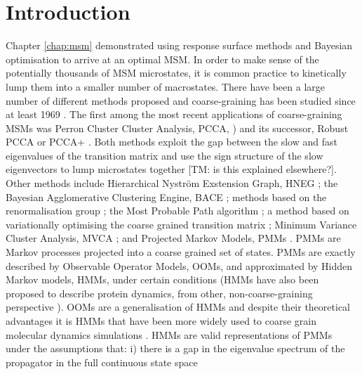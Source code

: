 \section{Introduction}
Chapter \ref{chap:msm} demonstrated using response surface methods and Bayesian optimisation to arrive at an optimal MSM. In order to make sense of the potentially thousands of MSM microstates, it is common practice to kinetically lump them into a smaller number of macrostates. There have been a large number of different methods proposed and coarse-graining has been studied since at least 1969 \cite{kuoLumpingAnalysisMonomolecular}\cite{weiLumpingAnalysisMonomolecular1969}. The first among the most recent applications of coarse-graining MSMs was Perron Cluster Cluster Analysis, PCCA, \cite{deuflhardIdentificationAlmostInvariant2000a}) and its successor, Robust PCCA or PCCA+ \cite{deuflhardRobustPerronCluster2005b}. Both methods exploit the gap between the slow and fast eigenvalues of the transition matrix and use the sign structure of the slow eigenvectors to lump microstates together [TM: is this explained elsewhere?]. Other methods include Hierarchical Nystr{\"o}m Exstension Graph, HNEG \cite{yaoHierarchicalNystromMethods2013a}; the Bayesian Agglomerative Clustering Engine, BACE \cite{bowmanImprovedCoarsegrainingMarkov2012a}; methods based on the renormalisation group \cite{orioliDimensionalReductionMarkov2016c}\cite{hummerOptimalDimensionalityReduction2015a}; the Most Probable Path algorithm \cite{jainIdentifyingMetastableStates2012a}; a method based on variationally optimising the coarse grained transition matrix \cite{martiniVariationalIdentificationMarkovian2017a};  Minimum Variance Cluster Analysis, MVCA \cite{husicMinimumVarianceClustering2018}; and Projected Markov Models, PMMs \cite{noeProjectedHiddenMarkov2013a}. PMMs are Markov processes projected into a coarse grained set of states. PMMs are exactly described by Observable Operator Models, OOMs, \cite{wuProjectedMetastableMarkov2015} and approximated by Hidden Markov models, HMMs, \cite{noeProjectedHiddenMarkov2013a} under certain conditions (HMMs have also been proposed to describe protein dynamics, from other,  non-coarse-graining perspective \cite{mcgibbonUnderstandingProteinDynamics}). OOMs are a generalisation of HMMs \cite{jaegerDiscretetimeDiscretevaluedObservable} and despite their theoretical advantages it is HMMs that have been more widely used to coarse grain molecular dynamics simulations \cite{mondalAtomicResolutionMechanism2018a}\cite{plattnerCompleteProteinProtein2017}\cite{panConformationalHeterogeneityMichaelis2016}\cite{juarez-jimenezDynamicDesignManipulation2020}\cite{wangDynamicalBehaviorVLactamases2019}\cite{FastFoldingPathwaysThrombinBinding2018}\cite{remingtonFluorescenceQuenching2aminopurinelabeled2019}\cite{curado-carballadaHiddenConformationsAspergillus2019}\cite{furiniIontriggeredSelectivityBacterial2018}\cite{yangMappingPathwayDynamics2018}\cite{ahalawatMappingSubstrateRecognition2018}\cite{olaposiMembraneBoundTranscriptionFactor2019}\cite{xiaoNaBindingModes2019}\cite{hansonWhatMakesKinase2019}. HMMs are valid representations of PMMs under the assumptions that: i) there is a gap in the eigenvalue spectrum of the propagator in the full continuous state space 